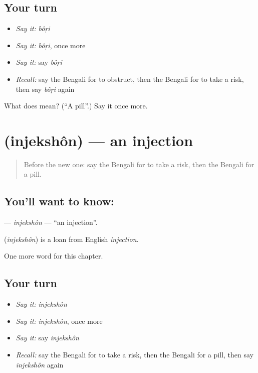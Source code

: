 \subsection*{Your turn}
\begin{itemize}
\raggedright
  \item \emph{Say it:} \emph{bôṛi}
  \item \emph{Say it:} \emph{bôṛi}, once more
  \item \emph{Say it:} say \emph{bôṛi}
  \item \emph{Recall:} say the Bengali for to obstruct, then the Bengali for to take a risk, then say \emph{bôṛi} again
\end{itemize}

\begin{tcolorbox}[breakable,colback=teal!4,colframe=teal!35!black,title={Before you move on}]
What does  mean? (\textquotedblleft{}A pill\textquotedblright{}.) Say it once more.
\end{tcolorbox}
\section[\texorpdfstring{\bn{ইনজেকশন} (injekshôn)}{ইনজেকশন (injekshôn)}]{ (injekshôn) — an injection}

\label{lesson:BN-C185-injekshon}



\begin{quote}
Before the new one: say the Bengali for to take a risk, then the Bengali for a pill.
\end{quote}

\subsection*{You'll want to know: }
\textbf{} — \emph{injekshôn} — \textquotedblleft{}an injection\textquotedblright{}.

\begin{cousinweb}
\textbf{} (\emph{injekshôn}) is a loan from English \emph{injection}.
\end{cousinweb}

\begin{grammarlens}[title={What you've built}]
One more word for this chapter.
\end{grammarlens}

\subsection*{Your turn}
\begin{itemize}
\raggedright
  \item \emph{Say it:} \emph{injekshôn}
  \item \emph{Say it:} \emph{injekshôn}, once more
  \item \emph{Say it:} say \emph{injekshôn}
  \item \emph{Recall:} say the Bengali for to take a risk, then the Bengali for a pill, then say \emph{injekshôn} again
\end{itemize}

